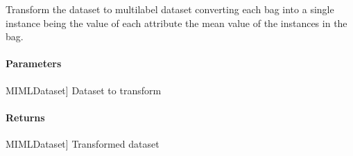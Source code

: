 \documentclass[letterpaper,10pt,english]{sphinxmanual}
\begin{document}
\begin{fulllineitems}
\begin{fulllineitems}
\begin{description}
\end{description}

\end{fulllineitems}


\begin{fulllineitems}
\label{\detokenize{transformation/mimlTOml/_autosummary/miml.transformation.mimlTOml.arithmetic.ArithmeticTransformation:miml.transformation.mimlTOml.arithmetic.ArithmeticTransformation.transform_dataset}}
\pysigstartsignatures
{}
\pysigstopsignatures
\sphinxAtStartPar
Transform the dataset to multilabel dataset converting each bag into a single instance being the value of each
attribute the mean value of the instances in the bag.


\paragraph{Parameters}
\label{\detokenize{transformation/mimlTOml/_autosummary/miml.transformation.mimlTOml.arithmetic.ArithmeticTransformation:id1}}\begin{description}
\sphinxlineitem{dataset}{[}MIMLDataset{]}
\sphinxAtStartPar
Dataset to transform

\end{description}


\paragraph{Returns}
\label{\detokenize{transformation/mimlTOml/_autosummary/miml.transformation.mimlTOml.arithmetic.ArithmeticTransformation:id2}}\begin{description}
\sphinxlineitem{transformed\_dataset}{[}MIMLDataset{]}
\sphinxAtStartPar
Transformed dataset

\end{description}

\end{fulllineitems}


\end{fulllineitems}
\end{document}
